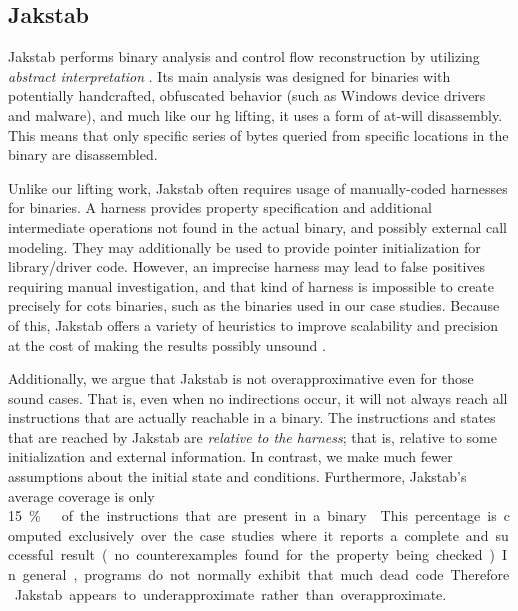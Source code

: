 \subsection{Jakstab}\label{related-jakstab}
Jakstab performs binary analysis and control flow reconstruction by utilizing
\emph{abstract interpretation} \autocite{cousot1976static,cousot1977abstract}.
Its main analysis was designed for binaries with potentially handcrafted, obfuscated behavior (such as Windows device drivers and malware),
and much like our \ac{hg} lifting, it uses a form of at-will disassembly.
This means that only specific series of bytes queried from specific locations in the binary are disassembled.

Unlike our lifting work, Jakstab often requires usage of manually-coded harnesses for binaries.
A harness provides property specification and additional intermediate operations not found in the actual binary, and possibly external call modeling.
They may additionally be used to provide pointer initialization for library/driver code.
However, an imprecise harness may lead to false positives requiring manual investigation, and that kind of harness is impossible to create precisely for \ac{cots} binaries, such as the binaries used in our case studies.
Because of this, Jakstab offers a variety of heuristics to improve scalability and precision at the cost of making the results possibly unsound  \autocite[129]{kinder2010static}.

Additionally, we argue that Jakstab is not overapproximative even for those sound cases.
That is, even when no indirections occur, it will not always reach all instructions that are actually reachable in a binary.
The instructions and states that are reached by Jakstab
are \emph{relative to the harness}; that is, relative to some initialization
and external information.
In contrast, we make much fewer assumptions about the initial state and conditions.
Furthermore, Jakstab's average coverage is only \SI{15}\percent\ of the instructions that are present in a binary \autocite[Table~6.2]{kinder2010static}.
This percentage is computed exclusively over the case studies where it reports a complete and successful result (no counterexamples found for the property being checked).
In general, programs do not normally exhibit that much dead code.
Therefore Jakstab appears to underapproximate rather than overapproximate.

